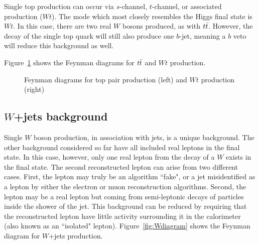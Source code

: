 Single top production can occur via $s$-channel, $t$-channel, or associated production ($Wt$). The mode which most closely resembles the Higgs final state is $Wt$. In this case, there are two real $W$ bosons produced, as with $t\bar{t}$. However, the decay of the single top quark will still also produce one $b$-jet, meaning a $b$ veto will reduce this background as well. 

Figure~\ref{fig:Topdiagram} shows the Feynman diagrams for $t\bar{t}$ and $Wt$ production.  

\begin{figure}[h!]
  \centering
  \captionsetup{justification=centering}

  \hspace{20pt}
  \caption{Feynman diagrams for top pair production (left) and $Wt$ production (right)}
  \label{fig:Topdiagram}
\end{figure}

\subsection{$W$+jets background}

Single $W$ boson production, in association with jets, is a unique background. The other background considered so far have all included real leptons in the final state. In this case, however, only one real lepton from the decay of a $W$ exists in the final state. The second reconstructed lepton can arise from two different cases. First, the lepton may truly be an algorithm ``fake", or a jet misidentified as a lepton by either the electron or muon reconstruction algorithms. Second, the lepton may be a real lepton but coming from semi-leptonic decays of particles inside the shower of the jet. This background can be reduced by requiring that the reconstructed lepton have little activity surrounding it in the calorimeter (also known as an ``isolated" lepton). Figure~\ref{fig:Wdiagram} shows the Feynman diagram for $W$+jets production. 


